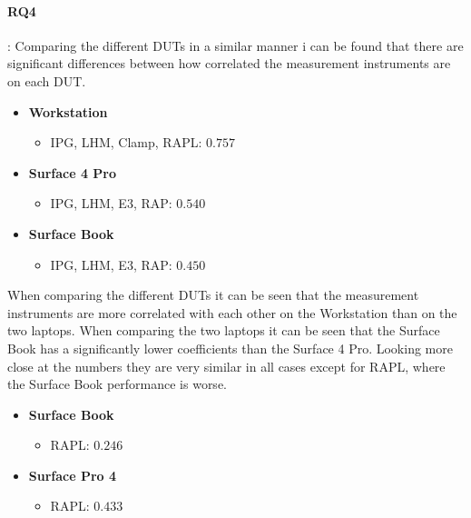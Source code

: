 \paragraph{RQ4}: Comparing the different DUTs in a similar manner i can be found that there are significant differences between how correlated the measurement instruments are on each DUT.

\begin{itemize}
    \item \textbf{Workstation}
    \begin{itemize}
        \item IPG, LHM, Clamp, RAPL: $0.757$%
    \end{itemize}
    \item \textbf{Surface 4 Pro}
    \begin{itemize}
        \item IPG, LHM, E3, RAP: $0.540$%
    \end{itemize}
    \item \textbf{Surface Book}
    \begin{itemize}
        \item IPG, LHM, E3, RAP: $0.450$ %
    \end{itemize}
\end{itemize}

When comparing the different DUTs it can be seen that the measurement instruments are more correlated with each other on the Workstation than on the two laptops. When comparing the two laptops it can be seen that the Surface Book has a significantly lower coefficients than the Surface 4 Pro. Looking more close at the numbers they are very similar in all cases except for RAPL, where the Surface Book performance is worse.

\begin{itemize}
    \item \textbf{Surface Book}
    \begin{itemize}
        \item RAPL: $0.246$
    \end{itemize}
    \item \textbf{Surface Pro 4}
    \begin{itemize}
        \item RAPL: $0.433$
    \end{itemize}
\end{itemize}









